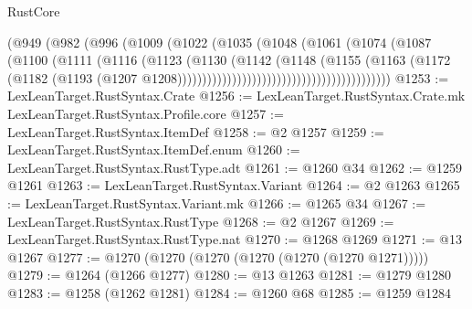 \begin{lexlean}{RustCore}
\begin{coremodule}
                                            (@949
                                              (@982
                                                (@996
                                                  (@1009
                                                    (@1022
                                                      (@1035
                                                        (@1048
                                                          (@1061
                                                            (@1074
                                                              (@1087
                                                                (@1100
                                                                  (@1111
                                                                    (@1116
                                                                      (@1123
                                                                        (@1130
                                                                          (@1142
                                                                            (@1148
                                                                              (@1155
                                                                                (@1163
                                                                                  (@1172
                                                                                    (@1182
                                                                                      (@1193
                                                                                        (@1207
                                                                                          @1208)))))))))))))))))))))))))))))))))))))))))))
@1253 := LexLeanTarget.RustSyntax.Crate
@1256 := LexLeanTarget.RustSyntax.Crate.mk LexLeanTarget.RustSyntax.Profile.core
@1257 := LexLeanTarget.RustSyntax.ItemDef
@1258 := @2 @1257
@1259 := LexLeanTarget.RustSyntax.ItemDef.enum
@1260 := LexLeanTarget.RustSyntax.RustType.adt
@1261 := @1260 @34
@1262 := @1259 @1261
@1263 := LexLeanTarget.RustSyntax.Variant
@1264 := @2 @1263
@1265 := LexLeanTarget.RustSyntax.Variant.mk
@1266 := @1265 @34
@1267 := LexLeanTarget.RustSyntax.RustType
@1268 := @2 @1267
@1269 := LexLeanTarget.RustSyntax.RustType.nat
@1270 := @1268 @1269
@1271 := @13 @1267
@1277 := @1270 (@1270 (@1270 (@1270 (@1270 (@1270 @1271)))))
@1279 := @1264 (@1266 @1277)
@1280 := @13 @1263
@1281 := @1279 @1280
@1283 := @1258 (@1262 @1281)
@1284 := @1260 @68
@1285 := @1259 @1284

\end{coremodule}
\end{lexlean}
